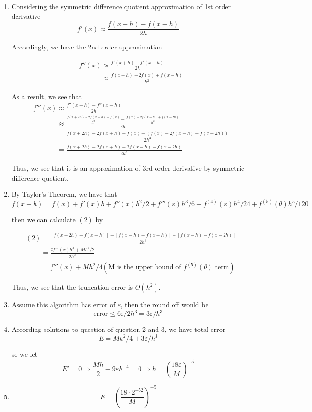 \documentclass[11pt]{article}
\begin{document}
	\begin{enumerate}
		\item Considering the symmetric difference quotient approximation of 1st order derivative
		\[f'(x) \approx \frac{f(x + h) - f(x - h)}{2h}\]
		
		Accordingly, we have the 2nd order approximation 
		
		\begin{align}
			&f''(x) \approx \frac{f'(x + h) - f'(x - h)}{2h}\nonumber\\
			&\phantom{f''(x)} \approx \frac{f(x + h) - 2f(x) + f(x - h)}{h^2}
		\end{align}
	
	As a result, we see that
	\begin{align}
		&f'''(x) \approx \frac{f''(x + h) - f''(x - h)}{2h}\nonumber\\
		&\phantom{f'''(x)} \approx \frac{\frac{f(x + 2h) - 2f(x + h) + f(x)}{h^2} - \frac{f(x) - 2f(x - h) + f(x - 2h)}{h^2}}{2h}\nonumber\\
		&\phantom{f'''(x)} = \frac{f(x + 2h) - 2f(x + h) + f(x) - (f(x) - 2f(x - h) + f(x - 2h))}{2h^3}\nonumber\\
		&\phantom{f'''(x)} = \frac{f(x + 2h) - 2f(x + h) + 2f(x - h) - f(x - 2h)}{2h^3}
	\end{align}
	
	Thus, we see that it is an approximation of 3rd order derivative by symmetric difference quotient.
	
		\item By Taylor's Theorem, we have that 
			\[f(x + h) = f(x) + f'(x)h + f''(x)h^2 / 2 + f'''(x)h^3 / 6 + f^{(4)}(x)h^4 / 24 + f^{(5)}(\theta)h^5 / 120\]
						
		then we can calculate $(2)$ by
		
		\begin{align}
			&(2) = \frac{[f(x + 2h) - f(x + h)] + [f(x - h) - f(x + h)] + [f(x - h) - f(x - 2h)]}{2h^3}\nonumber\\
			&\phantom{(2)} = \frac{2f'''(x)h^3 + Mh^5 / 2}{2h^3}\nonumber\\
			&\phantom{(2)} = f'''(x) + Mh^2 / 4(\text{M is the upper bound of }f^{(5)}(\theta)\text{ term})\nonumber
		\end{align}
		
		Thus, we see that the truncation error is $O(h^2)$.
		
		\item Assume this algorithm has error of $\varepsilon$, then the round off would be 
			\[\text{error} \leq 6\varepsilon / 2h^3 = 3\varepsilon / h^3 \]
			
		\item According solutions to question of question 2 and 3, we have total error
			\[E = Mh^2/4 + 3\varepsilon / h^3\]
			
			so we let 
			\[E' = 0 \Rightarrow \frac{Mh}{2} - 9\varepsilon h^{-4} = 0 \Rightarrow h = (\frac{18\varepsilon}{M})^{-5} \]
		\item \[E = (\frac{18\cdot 2^{-52}}{M})^{-5}\]
	\end{enumerate}
\end{document}
